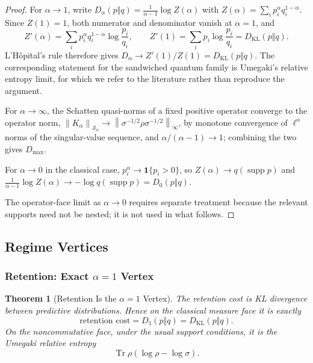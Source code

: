 \documentclass[12pt]{article}
\newtheorem{theorem}{Theorem}[section]
\theoremstyle{definition}
\DeclareMathOperator{\Tr}{Tr}
\DeclareMathOperator{\supp}{supp}
\newcommand{\norm}[1]{\left\lVert#1\right\rVert}
\newcommand{\Sp}[1]{\mathcal S_{#1}}
\newcommand{\Ren}[1]{D_{#1}}
\newcommand{\KL}{D_{\mathrm{KL}}}
\newcommand{\Dmax}{D_{\max}}
\begin{document}
\begin{proof}
For $\alpha\to1$, write
$D_\alpha(p\Vert q)=\frac{1}{\alpha-1}\log Z(\alpha)$ with
$Z(\alpha)=\sum_ip_i^\alpha q_i^{1-\alpha}$.  Since $Z(1)=1$, both numerator
and denominator vanish at $\alpha=1$, and
\[
Z'(\alpha)=\sum_ip_i^\alpha q_i^{1-\alpha}\log\frac{p_i}{q_i},
\qquad
Z'(1)=\sum_ip_i\log\frac{p_i}{q_i}=\KL(p\Vert q).
\]
L'H\^opital's rule therefore gives
$D_\alpha\to Z'(1)/Z(1)=\KL(p\Vert q)$.  The corresponding statement for the
sandwiched quantum family is Umegaki's relative entropy limit, for which we
refer to the literature rather than reproduce the argument.

For $\alpha\to\infty$, the Schatten quasi-norms of a fixed positive operator
converge to the operator norm,
$\norm{K_\alpha}_{\Sp{\alpha}}\to\norm{\sigma^{-1/2}\rho\sigma^{-1/2}}_\infty$,
by monotone convergence of $\ell^\alpha$ norms of the singular-value sequence,
and $\alpha/(\alpha-1)\to1$; combining the two gives $\Dmax$.

For $\alpha\to0$ in the classical case, $p_i^\alpha\to\mathbf 1\{p_i>0\}$, so
$Z(\alpha)\to q(\supp p)$ and
$\frac{1}{\alpha-1}\log Z(\alpha)\to-\log q(\supp p)=D_0(p\Vert q)$.

The operator-face limit as $\alpha\to0$ requires separate treatment because
the relevant supports need not be nested; it is not used in what follows.
\end{proof}

\subsection{Regime Vertices}
\label{subsec:exponent-regimes}

\subsubsection{Retention: Exact $\alpha=1$ Vertex}
\label{subsubsec:exponent-retention}

\begin{theorem}[Retention Is the $\alpha=1$ Vertex]
\label{thm:retention-alpha1}
The retention cost is KL divergence between predictive distributions.  Hence
on the classical measure face it is exactly
\[
\text{retention cost}
=
\Ren{1}(p\Vert q)
=
\KL(p\Vert q).
\]
On the noncommutative face, under the usual support conditions, it is the
Umegaki relative entropy
\[
\Tr\rho(\log\rho-\log\sigma).
\]
\end{theorem}
\end{document}
